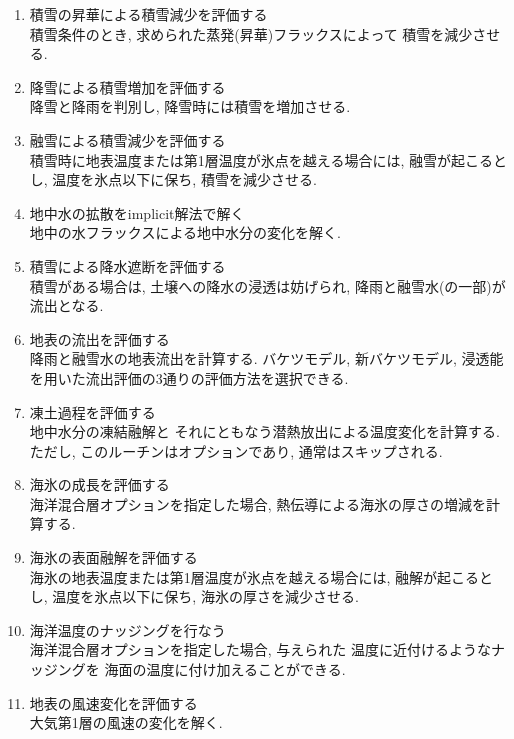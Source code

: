 \begin{enumerate}
  \item 積雪の昇華による積雪減少を評価する  \\
            積雪条件のとき, 求められた蒸発(昇華)フラックスによって
            積雪を減少させる.

  \item 降雪による積雪増加を評価する  \\
            降雪と降雨を判別し, 降雪時には積雪を増加させる.

  \item 融雪による積雪減少を評価する  \\
            積雪時に地表温度または第1層温度が氷点を越える場合には,
            融雪が起こるとし, 温度を氷点以下に保ち,
            積雪を減少させる. 

  \item 地中水の拡散をimplicit解法で解く  \\
            地中の水フラックスによる地中水分の変化を解く.
            
  \item 積雪による降水遮断を評価する  \\
            積雪がある場合は, 土壌への降水の浸透は妨げられ,
            降雨と融雪水(の一部)が流出となる. 

  \item 地表の流出を評価する  \\
            降雨と融雪水の地表流出を計算する.
            バケツモデル, 新バケツモデル,
            浸透能を用いた流出評価の3通りの評価方法を選択できる.

  \item 凍土過程を評価する  \\
            地中水分の凍結融解と
            それにともなう潜熱放出による温度変化を計算する.
            ただし, このルーチンはオプションであり, 
            通常はスキップされる.

  \item 海氷の成長を評価する  \\
            海洋混合層オプションを指定した場合,
            熱伝導による海氷の厚さの増減を計算する.

  \item 海氷の表面融解を評価する  \\
            海氷の地表温度または第1層温度が氷点を越える場合には,
            融解が起こるとし, 温度を氷点以下に保ち,
            海氷の厚さを減少させる. 

  \item 海洋温度のナッジングを行なう  \\
            海洋混合層オプションを指定した場合, 与えられた
            温度に近付けるようなナッジングを
            海面の温度に付け加えることができる.

  \item 地表の風速変化を評価する   \\
            大気第1層の風速の変化を解く.
\end{enumerate}

